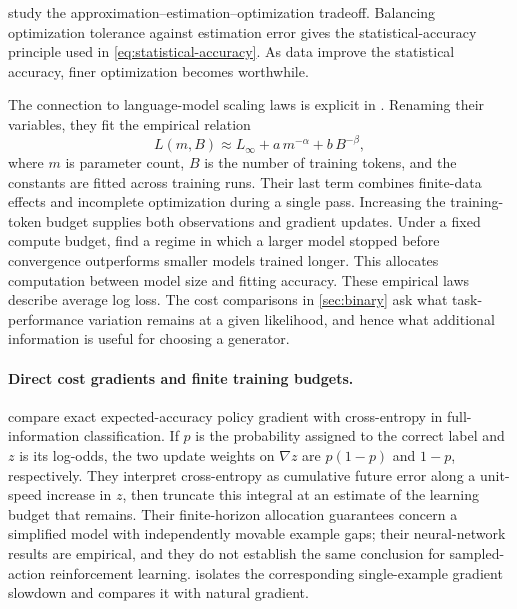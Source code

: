\documentclass[11pt,twoside]{article}
\theoremstyle{definition}
\theoremstyle{remark}
\begin{document}
\citet[Sections~2--3]{bottou2007} study the
approximation--estimation--optimization tradeoff. Balancing optimization
tolerance against estimation error gives the statistical-accuracy
principle used in \cref{eq:statistical-accuracy}.
As data improve the statistical accuracy, finer optimization becomes
worthwhile.

The connection to language-model scaling laws is explicit in
\citet[Section~3.3 and Appendix~D.2]{hoffmann2022}. Renaming their
variables, they fit the empirical relation
\[
 L(m,B)\approx L_\infty+a\,m^{-\alpha}+b\,B^{-\beta},
\]
where \(m\) is parameter count, \(B\) is the number of training tokens,
and the constants are fitted across training runs.
Their last term combines finite-data effects and incomplete optimization
during a single pass. Increasing the training-token budget supplies
both observations and gradient updates.
Under a fixed compute budget, \citet{kaplan2020} find a regime in
which a larger model stopped before convergence outperforms smaller
models trained longer. This allocates computation between model size
and fitting accuracy.
These empirical laws describe average log loss. The cost comparisons
in \cref{sec:binary} ask what task-performance variation remains at
a given likelihood, and hence what additional information is useful
for choosing a generator.

\paragraph{Direct cost gradients and finite training budgets.}
\citet{osband2026planning} compare exact expected-accuracy policy gradient
with cross-entropy in full-information classification. If \(p\) is the
probability assigned to the correct label and \(z\) is its log-odds, the two
update weights on \(\nabla z\) are \(p(1-p)\) and \(1-p\), respectively.
They interpret cross-entropy as cumulative future error along a unit-speed
increase in \(z\), then truncate this integral at an estimate of the learning
budget that remains. Their finite-horizon allocation guarantees concern a
simplified model with independently movable example gaps; their neural-network
results are empirical, and they do not establish the same conclusion for
sampled-action reinforcement learning.  isolates
the corresponding single-example gradient slowdown and compares it with
natural gradient.
\end{document}
